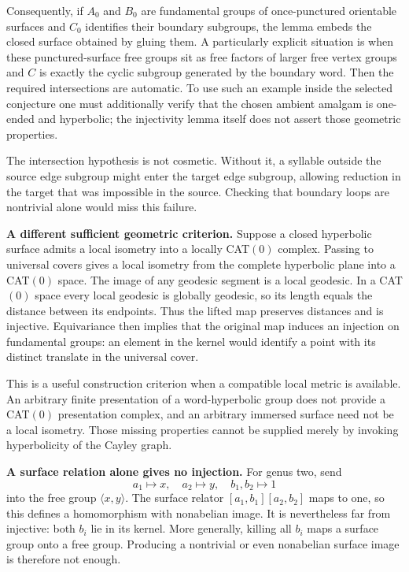 \documentclass[11pt]{article}
\begin{document}
Consequently, if $A_0$ and $B_0$ are fundamental groups of once-punctured orientable surfaces and $C_0$ identifies their boundary subgroups, the lemma embeds the closed surface obtained by gluing them. A particularly explicit situation is when these punctured-surface free groups sit as free factors of larger free vertex groups and $C$ is exactly the cyclic subgroup generated by the boundary word. Then the required intersections are automatic. To use such an example inside the selected conjecture one must additionally verify that the chosen ambient amalgam is one-ended and hyperbolic; the injectivity lemma itself does not assert those geometric properties.

The intersection hypothesis is not cosmetic. Without it, a syllable outside the source edge subgroup might enter the target edge subgroup, allowing reduction in the target that was impossible in the source. Checking that boundary loops are nontrivial alone would miss this failure.

\textbf{A different sufficient geometric criterion.} Suppose a closed hyperbolic surface admits a local isometry into a locally CAT$(0)$ complex. Passing to universal covers gives a local isometry from the complete hyperbolic plane into a CAT$(0)$ space. The image of any geodesic segment is a local geodesic. In a CAT$(0)$ space every local geodesic is globally geodesic, so its length equals the distance between its endpoints. Thus the lifted map preserves distances and is injective. Equivariance then implies that the original map induces an injection on fundamental groups: an element in the kernel would identify a point with its distinct translate in the universal cover.

This is a useful construction criterion when a compatible local metric is available. An arbitrary finite presentation of a word-hyperbolic group does not provide a CAT$(0)$ presentation complex, and an arbitrary immersed surface need not be a local isometry. Those missing properties cannot be supplied merely by invoking hyperbolicity of the Cayley graph.

\textbf{A surface relation alone gives no injection.} For genus two, send
\[
 a_1\mapsto x,\quad a_2\mapsto y,\quad b_1,b_2\mapsto1
\]
into the free group $\langle x,y\rangle$. The surface relator $[a_1,b_1][a_2,b_2]$ maps to one, so this defines a homomorphism with nonabelian image. It is nevertheless far from injective: both $b_i$ lie in its kernel. More generally, killing all $b_i$ maps a surface group onto a free group. Producing a nontrivial or even nonabelian surface image is therefore not enough.
\end{document}
